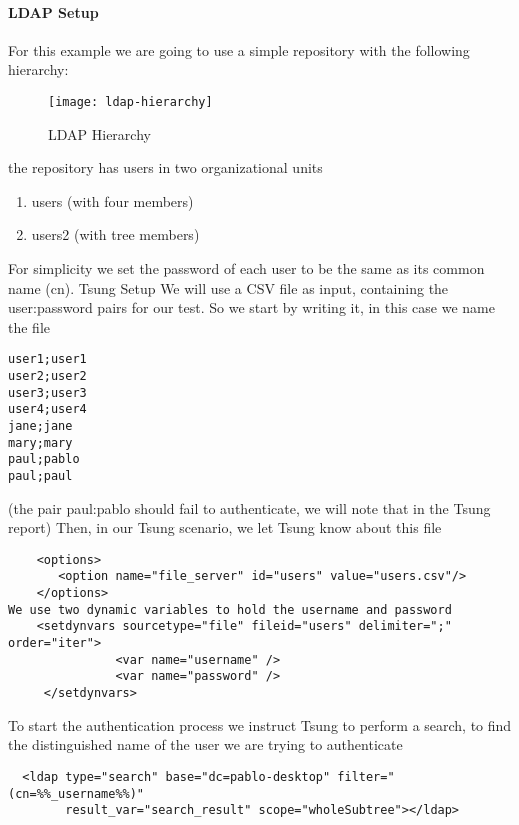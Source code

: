 \documentclass{TSUNG-en}
\begin{document}
\paragraph{LDAP Setup}
For this example we are going to use a simple repository with the following hierarchy:

\begin{figure}[htb]
  \begin{center}
    \texttt{[image: ldap-hierarchy]}
    \end{center}
      \caption{LDAP Hierarchy}
    \label{fig:ldap:hierarchy}
\end{figure}

the repository has users in two organizational units
\begin{enumerate}
\item users (with four members)
\item users2 (with tree members)
\end{enumerate}

For simplicity we set the password of each user to be  the same as its common name (cn).
Tsung Setup
We will use a CSV file as input, containing the user:password pairs
for our test. So we start by writing it, in this case we name the file 

\begin{Verbatim}
user1;user1
user2;user2
user3;user3
user4;user4
jane;jane
mary;mary
paul;pablo
paul;paul
\end{Verbatim}

(the pair paul:pablo should fail to authenticate, we will note that in the Tsung report)
Then, in our Tsung scenario, we let Tsung know about this file

\begin{Verbatim}
    <options>
       <option name="file_server" id="users" value="users.csv"/>
    </options>
We use two dynamic variables to hold the username and password
    <setdynvars sourcetype="file" fileid="users" delimiter=";" order="iter">
               <var name="username" />
               <var name="password" />
     </setdynvars>
\end{Verbatim}

To start the authentication process we instruct Tsung to perform a search, to find the distinguished name of the user we are trying to authenticate

\begin{Verbatim}
  <ldap type="search" base="dc=pablo-desktop" filter="(cn=%%_username%%)"
        result_var="search_result" scope="wholeSubtree"></ldap>
\end{Verbatim}
\end{document}
